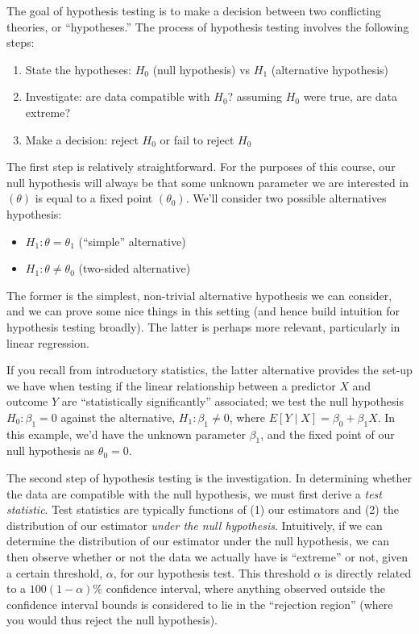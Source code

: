 \documentclass[
  letterpaper,
  DIV=11,
  numbers=noendperiod]{scrreprt}
\begin{document}
The goal of hypothesis testing is to make a decision between two
conflicting theories, or ``hypotheses.'' The process of hypothesis
testing involves the following steps:

\begin{enumerate}
\def\labelenumi{\arabic{enumi}.}
\item
  State the hypotheses: \(H_0\) (null hypothesis) vs \(H_1\)
  (alternative hypothesis)
\item
  Investigate: are data compatible with \(H_0\)? assuming \(H_0\) were
  true, are data extreme?
\item
  Make a decision: reject \(H_0\) or fail to reject \(H_0\)
\end{enumerate}

The first step is relatively straightforward. For the purposes of this
course, our null hypothesis will always be that some unknown parameter
we are interested in \((\theta)\) is equal to a fixed point
\((\theta_0)\). We'll consider two possible alternatives hypothesis:

\begin{itemize}
\item
  \(H_1: \theta = \theta_1\) (``simple'' alternative)
\item
  \(H_1: \theta \neq \theta_0\) (two-sided alternative)
\end{itemize}

The former is the simplest, non-trivial alternative hypothesis we can
consider, and we can prove some nice things in this setting (and hence
build intuition for hypothesis testing broadly). The latter is perhaps
more relevant, particularly in linear regression.

If you recall from introductory statistics, the latter alternative
provides the set-up we have when testing if the linear relationship
between a predictor \(X\) and outcome \(Y\) are ``statistically
significantly'' associated; we test the null hypothesis
\(H_0: \beta_1 = 0\) against the alternative, \(H_1: \beta_1 \neq 0\),
where \(E[Y \mid X] = \beta_0 + \beta_1 X\). In this example, we'd have
the unknown parameter \(\beta_1\), and the fixed point of our null
hypothesis as \(\theta_0 = 0\).

The second step of hypothesis testing is the investigation. In
determining whether the data are compatible with the null hypothesis, we
must first derive a \emph{test statistic}. Test statistics are typically
functions of (1) our estimators and (2) the distribution of our
estimator \emph{under the null hypothesis}. Intuitively, if we can
determine the distribution of our estimator under the null hypothesis,
we can then observe whether or not the data we actually have is
``extreme'' or not, given a certain threshold, \(\alpha\), for our
hypothesis test. This threshold \(\alpha\) is directly related to a
\(100(1 - \alpha)\%\) confidence interval, where anything observed
outside the confidence interval bounds is considered to lie in the
``rejection region'' (where you would thus reject the null hypothesis).
\end{document}
